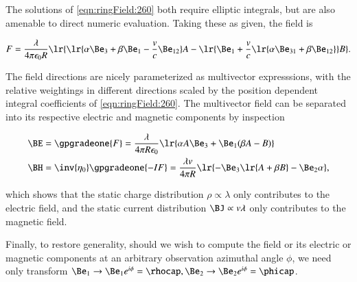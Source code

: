 The solutions of \cref{eqn:ringField:260} both require elliptic integrals, but are also amenable to direct numeric evaluation.  Taking these as given, the field is

\begin{dmath}\label{eqn:ringField:220}
F
=
\frac{\lambda}{4 \pi \epsilon_0 R}
\lr{
\lr{ \alpha \Be_3 + \beta \Be_1 -\frac{v }{c}\Be_{12} } A
- \lr{
\Be_1 + \frac{v}{c} \lr{ \alpha \Be_{31} + \beta \Be_{12} } } B
}.
\end{dmath}

The field directions are nicely parameterized as multivector expresssions, with the relative weightings in different directions scaled by the position dependent integral coefficients of \cref{eqn:ringField:260}.
The multivector field can be separated into its respective electric and magnetic components by inspection

\begin{dmath}\label{eqn:ringField:240}
\begin{aligned}
\BE &=
\gpgradeone{F}
=
\frac{\lambda}{4 \pi R \epsilon_0} \lr{ \alpha A \Be_3 + \Be_1( \beta A - B) } \\
\BH &=
\inv{\eta_0} \gpgradeone{-I F}
=
\frac{\lambda v}{4 \pi R } \lr{ -\Be_3 \lr{ A + \beta B } - \Be_2 \alpha },
\end{aligned}
\end{dmath}

which shows that the static charge distribution \( \rho \propto \lambda \) only contributes to the electric field, and the static current distribution \( \BJ \propto v \lambda \) only contributes to the magnetic field.

Finally, to restore generality,
should we wish to compute the field or its electric or magnetic components at an arbitrary observation azimuthal angle \( \phi \), we need only transform \( \Be_1 \rightarrow \Be_1 e^{i \phi} = \rhocap, \Be_2 \rightarrow \Be_2 e^{i\phi} = \phicap \).


